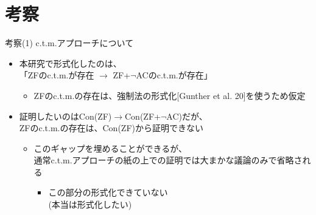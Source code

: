 \documentclass[17pt]{beamer}
\begin{document}
\section {考察}

\begin{frame}{考察(1) {\normalsize c.t.m.アプローチについて}}
    \vspace{-35pt}
    \,{\small 
    \begin{itemize}[itemsep=4pt]
        \item 本研究で形式化したのは、\\
              「ZFのc.t.m.が存在 $\rightarrow$ ZF+$\neg$ACのc.t.m.が存在」
              \begin{itemize}
                \item ZFのc.t.m.の存在は、強制法の形式化[Gunther et al. 20]を使うため仮定
              \end{itemize}
        \item 証明したいのはCon(ZF)$\rightarrow$Con(ZF+$\neg$AC)だが、\\
              ZFのc.t.m.の存在は、Con(ZF)から証明できない
              \begin{itemize} 
                \item このギャップを埋めることができるが、\\通常c.t.m.アプローチの紙の上での証明では大まかな議論のみで省略される
                \begin{itemize}
                    \item この部分の形式化できていない\\
                    (本当は形式化したい)
                \end{itemize}
              \end{itemize}
    \end{itemize}
    }
\end{frame}
\end{document}
